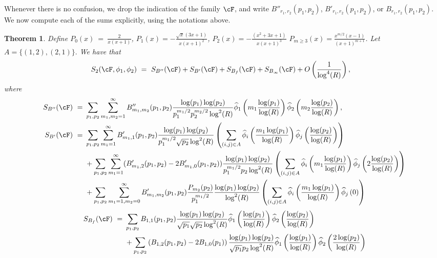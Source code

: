 \documentclass[11pt, reqno]{amsart}
\newtheorem{theorem}{Theorem}[section]
\theoremstyle{definition}
\theoremstyle{remark}
\numberwithin{equation}{section}
\renewcommand{\hat}{\widehat}
\begin{document}
Whenever there is no confusion, we drop the indication of the family $\cF$, and write  $B''_{r_1,r_2}(p_1,p_2)$, $B'_{r_1,r_2}(p_1,p_2)$, or $B_{r_1,r_2}(p_1,p_2)$. We now compute each of the sums explicitly, using the notations above.

\begin{theorem}\label{thm: S_2.Formula}
    Define $P_0(x)\ = \ \frac{2}{x(x+1)}$, $P_1(x)=-\frac{\sqrt{x}(3 x+1) }{x(x+1)^2}$, $P_2(x)=-\frac{\left(x^2+3 x+1\right) }{x(x+1)^3}$
$P_{m\geq3}(x)=\frac{x^{m / 2}(x-1) }{(x+1)^{m+1}}$. Let $A=\{(1,2),(2,1) \}.$ We have that 
 \begin{align*}
        S_2(\cF,\phi_1,\phi_2)&\ = \  S_{B''}(\cF) + S_{B'}(\cF)+S_{B_f}(\cF)+ S_{B_\infty}(\cF)+O\left(\frac{1}{\log^4(R)}\right),\end{align*} where
 \footnotesize\begin{align}
    S_{B''}(\cF) \ = \  &\sum_{p_1,p_2}\sum_{m_1,m_2=1}^{\infty}  B''_{m_1,m_2}(p_1,p_2) \frac{\log(p_1)\log(p_2)}{p_1^{m_1/2}p_2^{m_2/2}\log^2(R)}\hat\phi_1 \left(m_1 \frac{\log(p_1)}{\log(R)}\right)\hat \phi_2 \left(m_2 \frac{\log(p_2)}{\log(R)}\right),\\
    S_{B'}(\cF)   \ =\  &  \sum_{p_1,p_2}\sum_{m_1=1}^{\infty} B'_{m_1,1}(p_1,p_2) \frac{\log(p_1)\log(p_2)}{p_1^{m_1/2}\sqrt{p_2}\log^2(R)} \left(\sum_{(i,j) \in A}\hat\phi_i\left(\frac{m_1\log(p_1)}{\log(R)}\right)\hat\phi_j\left(\frac{\log(p_2)}{\log(R)}\right)\right)\notag\\&+\sum_{p_1,p_2}\sum_{m_1=1}^{\infty} (B'_{m_1,2}(p_1,p_2)-2B'_{m_1,0}(p_1,p_2)) \frac{\log(p_1)\log(p_2)}{p_1^{m_1/2}p_2\log^2(R)} \left(\sum_{(i,j) \in A}\hat\phi_i\left(m_1\frac{\log(p_1)}{\log(R)}\right)\hat\phi_j\left(2\frac{\log(p_2)}{\log(R)}\right)\right)  \notag\\
    &+\sum_{p_1,p_2}\sum_{m_1=1,m_2=0}^{\infty}B'_{m_1,m_2}(p_1,p_2)\frac{P_{m_2}(p_2)}{p_1^{m_1/2}}\frac{\log(p_1)\log (p_2)}{\log^2(R)}\left(\sum_{(i,j) \in A}\hat\phi_i\left(\frac{m_1\log(p_1)}{\log(R)}\right)\hat\phi_j\left(0\right)\right)
    \end{align}
    \begin{align}
    S_{B_f}(\cF) \ = \  &\sum_{p_1,p_2} B_{1,1}(p_1,p_2)\frac{\log(p_1)\log(p_2)}{\sqrt{p_1}\sqrt{p_2}\log^2(R)} \hat\phi_1\left(\frac{\log(p_1)}{\log(R)}\right)\hat\phi_2\left(\frac{\log(p_2)}{\log(R)}\right)\notag\\
    &+\sum_{p_1,p_2} \left(B_{1,2}(p_1,p_2)-2B_{1,0}(p_1)\right)\frac{\log(p_1)\log(p_2)}{\sqrt{p_1}p_2\log^2(R)} \hat\phi_1\left(\frac{\log(p_1)}{\log(R)}\right)\hat\phi_2\left(\frac{2\log(p_2)}{\log(R)}\right)\notag\\

\end{align}
\end{theorem}
\end{document}
